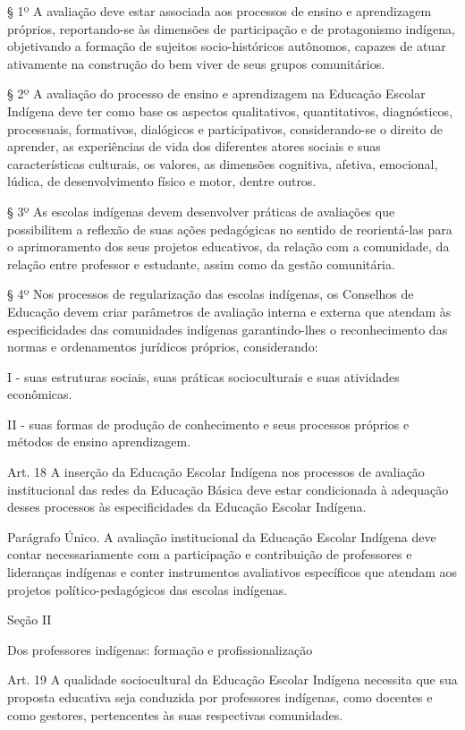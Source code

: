 \documentclass[
]{book}
\begin{document}
§ 1º A avaliação deve estar associada aos processos de ensino e aprendizagem próprios, reportando-se às dimensões de participação e de protagonismo indígena, objetivando a formação de sujeitos socio-históricos autônomos, capazes de atuar ativamente na construção do bem viver de seus grupos comunitários.

§ 2º A avaliação do processo de ensino e aprendizagem na Educação Escolar Indígena deve ter como base os aspectos qualitativos, quantitativos, diagnósticos, processuais, formativos, dialógicos e participativos, considerando-se o direito de aprender, as experiências de vida dos diferentes atores sociais e suas características culturais, os valores, as dimensões cognitiva, afetiva, emocional, lúdica, de desenvolvimento físico e motor, dentre outros.

§ 3º As escolas indígenas devem desenvolver práticas de avaliações que possibilitem a reflexão de suas ações pedagógicas no sentido de reorientá-las para o aprimoramento dos seus projetos educativos, da relação com a comunidade, da relação entre professor e estudante, assim como da gestão comunitária.

§ 4º Nos processos de regularização das escolas indígenas, os Conselhos de Educação devem criar parâmetros de avaliação interna e externa que atendam às especificidades das comunidades indígenas garantindo-lhes o reconhecimento das normas e ordenamentos jurídicos próprios, considerando:

I - suas estruturas sociais, suas práticas socioculturais e suas atividades econômicas.

II - suas formas de produção de conhecimento e seus processos próprios e métodos de ensino aprendizagem.

Art. 18 A inserção da Educação Escolar Indígena nos processos de avaliação institucional das redes da Educação Básica deve estar condicionada à adequação desses processos às especificidades da Educação Escolar Indígena.

Parágrafo Único. A avaliação institucional da Educação Escolar Indígena deve contar necessariamente com a participação e contribuição de professores e lideranças indígenas e conter instrumentos avaliativos específicos que atendam aos projetos político-pedagógicos das escolas indígenas.

Seção II

Dos professores indígenas: formação e profissionalização

Art. 19 A qualidade sociocultural da Educação Escolar Indígena necessita que sua proposta educativa seja conduzida por professores indígenas, como docentes e como gestores, pertencentes às suas respectivas comunidades.
\end{document}
